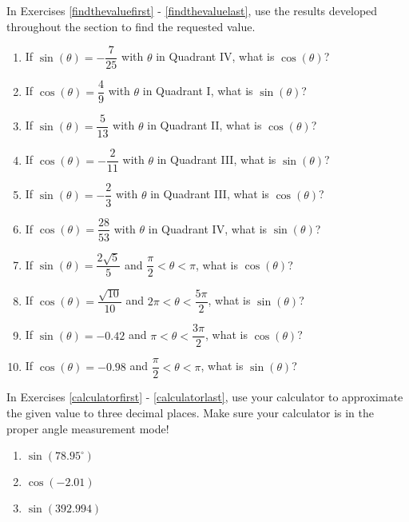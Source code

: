 \newpage

In Exercises \ref{findthevaluefirst} - \ref{findthevaluelast}, use the results developed throughout the section to find the requested value.

\begin{enumerate}

\setcounter{enumi}{\value{HW}}

\item If $\sin(\theta) = -\dfrac{7}{25}$ with $\theta$ in Quadrant IV, what is $\cos(\theta)$? \label{findthevaluefirst}
\item If $\cos(\theta) = \dfrac{4}{9}$ with $\theta$ in Quadrant I, what is $\sin(\theta)$?
\item If $\sin(\theta) = \dfrac{5}{13}$ with $\theta$ in Quadrant II, what is $\cos(\theta)$?
\item If $\cos(\theta) = -\dfrac{2}{11}$ with $\theta$ in Quadrant III, what is $\sin(\theta)$?
\item If $\sin(\theta) = -\dfrac{2}{3}$ with $\theta$ in Quadrant III, what is $\cos(\theta)$?
\item If $\cos(\theta) = \dfrac{28}{53}$ with $\theta$ in Quadrant IV, what is $\sin(\theta)$?
\item  If $\sin(\theta) = \dfrac{2\sqrt{5}}{5}$ and $\dfrac{\pi}{2} < \theta < \pi$, what is $\cos(\theta)$?
\item  If $\cos(\theta) = \dfrac{\sqrt{10}}{10}$ and $2\pi < \theta < \dfrac{5\pi}{2}$, what is $\sin(\theta)$?
\item  If $\sin(\theta) = -0.42$ and $\pi < \theta < \dfrac{3\pi}{2}$, what is  $\cos(\theta)$?
\item  If $\cos(\theta) = -0.98$ and $\dfrac{\pi}{2} < \theta < \pi$, what is $\sin(\theta)$? \label{findthevaluelast}

\setcounter{HW}{\value{enumi}}

\end{enumerate}

In Exercises \ref{calculatorfirst} - \ref{calculatorlast}, use your calculator to approximate the given value to three decimal places.  Make sure your calculator is in the proper angle measurement mode!

\begin{multicols}{3}

\begin{enumerate}

\setcounter{enumi}{\value{HW}}

\item $\sin(78.95^{\circ})$ \label{calculatorfirst}
\item $\cos(-2.01)$
\item $\sin(392.994)$

\setcounter{HW}{\value{enumi}}

\end{enumerate}

\end{multicols}

